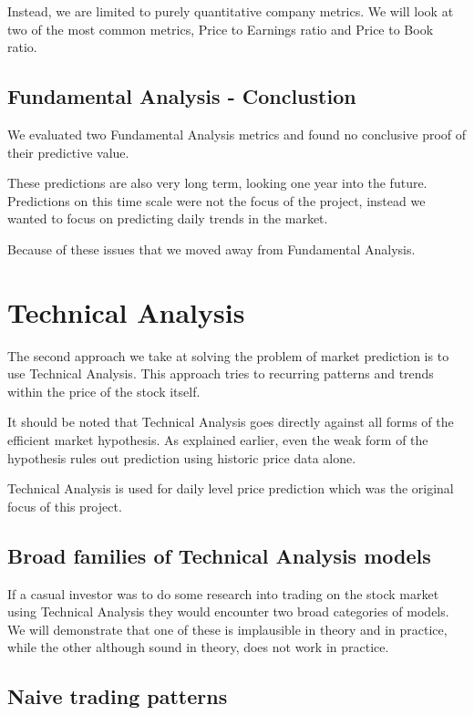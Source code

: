 \documentclass{report}
\begin{document}
Instead, we are limited to purely quantitative company metrics. We will look at two of the most common metrics, Price to Earnings ratio and Price to Book ratio.

\section{Fundamental Analysis - Conclustion}

We evaluated two Fundamental Analysis metrics and found no conclusive proof of their predictive value.  

These predictions are also very long term, looking one year into the future. Predictions on this time scale were not the focus of the project, instead we wanted to focus on predicting daily trends in the market.

Because of these issues that we moved away from Fundamental Analysis.

\chapter{Technical Analysis}


The second approach we take at solving the problem of market prediction is to use Technical Analysis. This approach tries to recurring patterns and trends within the price of the stock itself.

It should be noted that Technical Analysis goes directly against all forms of the efficient market hypothesis. As explained earlier, even the weak form of the hypothesis rules out prediction using historic price data alone.

Technical Analysis is used for daily level price prediction which was the original focus of this project. 

\section{Broad families of Technical Analysis models}

If a casual investor was to do some research into trading on the stock market using Technical Analysis they would encounter two broad categories of models. We will demonstrate that one of these is implausible in theory and in practice, while the other although sound in theory, does not work in practice.

\section{Naive trading patterns}
\end{document}
